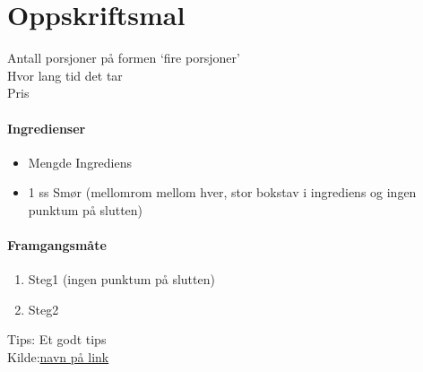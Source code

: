\section{﻿Oppskriftsmal}
\label{oppskrifsmal}

Antall porsjoner på formen `fire porsjoner'\\
Hvor lang tid det tar\\
Pris

\paragraph{Ingredienser}
\begin{itemize}[noitemsep]
	\item Mengde Ingrediens
	\item 1 ss Smør (mellomrom mellom hver, stor bokstav i ingrediens og ingen punktum på slutten)
\end{itemize}

\paragraph{Framgangsmåte}
\begin{enumerate}[noitemsep]
	\item Steg1 (ingen punktum på slutten)
	\item Steg2
\end{enumerate}

Tips: Et godt tips \\

Kilde:\href{https://link}{navn på link}

